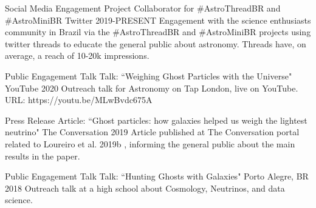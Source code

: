 

\begin{cventries}
    
  \cventry
    {Social Media Engagement} %
    {Project Collaborator for \#AstroThreadBR and \#AstroMiniBR } %
    {Twitter} %
    {2019-PRESENT} %
    {
      {Engagement with the science enthusiasts community in Brazil via the \#AstroThreadBR and \#AstroMiniBR projects using twitter threads to educate the general public about astronomy. Threads have, on average, a reach of 10-20k impressions.}
    }

  \cventry
    {Public Engagement Talk} %
    {Talk: ``Weighing Ghost Particles with the Universe"} %
    {YouTube} %
    {2020} %
    {
      {Outreach talk for Astronomy on Tap London, live on YouTube. URL: https://youtu.be/MLwBvdc675A}
    }

  
  \cventry
    {Press Release} %
    {Article: ``Ghost particles: how galaxies helped us weigh the lightest neutrino"} %
    {The Conversation} %
    {2019} %
    {
      {Article published at The Conversation portal related to Loureiro et al. 2019b , informing the general public about the main results in the paper.}
    }


 \cventry
    {Public Engagement Talk} %
    {Talk: ``Hunting Ghosts with Galaxies"} %
    {Porto Alegre, BR} %
    {2018} %
    {
      {Outreach talk at a high school about Cosmology, Neutrinos, and data science.}
    }


\end{cventries}
